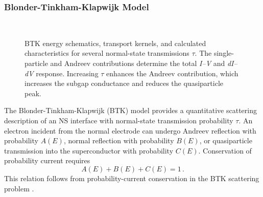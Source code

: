         \subsubsection*{Blonder-Tinkham-Klapwijk Model}
            \begin{figure}[t]
                \centering
                \setcounter{subfigure}{0}
                \hfill
                \setcounter{subfigure}{2}
                \hfill
                \setcounter{subfigure}{4}
                \\
                \setcounter{subfigure}{1}
                \hfill
                \setcounter{subfigure}{3}
                \hfill
                \setcounter{subfigure}{5}
                \caption{
                    BTK energy schematics, transport kernels, and calculated characteristics for several normal-state transmissions $\tau$. The single-particle and Andreev contributions determine the total \textit{I--V} and \textit{dI--dV} response. Increasing $\tau$ enhances the Andreev contribution, which increases the subgap conductance and reduces the quasiparticle peak.
                    }
                \label{fig:meso:btk}
            \end{figure}
            The Blonder-Tinkham-Klapwijk (BTK) model provides a quantitative scattering description of an NS interface with normal-state transmission probability $\tau$. An electron incident from the normal electrode can undergo Andreev reflection with probability $A(E)$, normal reflection with probability $B(E)$, or quasiparticle transmission into the superconductor with probability $C(E)$. Conservation of probability current requires
            \begin{equation}
                A(E) + B(E) + C(E) = 1\,.
                \label{eq:meso:btk-probability}
            \end{equation}
            This relation follows from probability-current conservation in the BTK scattering problem \cite{blonder_transition_1982}.

